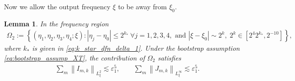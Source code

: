\documentclass[reqno,english,11pt]{amsart}
\newcommand{\eps}{\varepsilon}
\newcommand{\snorm}[1]{\left\|#1\right\|}
\newtheorem{lemma}[theorem]{Lemma}
\theoremstyle{definition}
\numberwithin{equation}{section}
\begin{document}
Now we allow  the output  frequency $\xi$ to be away from $\xi_0$.
\begin{lemma}
\label{prop:anomalous_resonance_case_2}
In the frequency region
\begin{multline}\label{eqn:near_res_region2}
    \Omega_2:= \left\{ (\eta_1, \eta_2, \eta_3, \eta_4; \xi) : |\eta_j - \eta_0| \leq 2^{k_*} \ \forall j=1,2,3,4,
    \text{ and } |\xi - \xi_0| \sim 2^k,\; 2^k\in \left[2^{4}2^{k_*}, 2^{-10}\right] \right\},
\end{multline}
where $k_*$  is given in \eqref{eq:k_star_dfn_delta_1}. Under the bootstrap assumption \eqref{eq:bootstrap_assump_XT}, the contribution of $\Omega_2$ satisfies
\begin{align}
\sum_m \snorm{I_{m,k}}_{L^2_\xi} \lesssim \eps_1^5,\qquad
\sum_m \snorm{J_{m,k}}_{L^\infty_\xi} \lesssim \eps_1^5.
\end{align}
\end{lemma}
\end{document}

